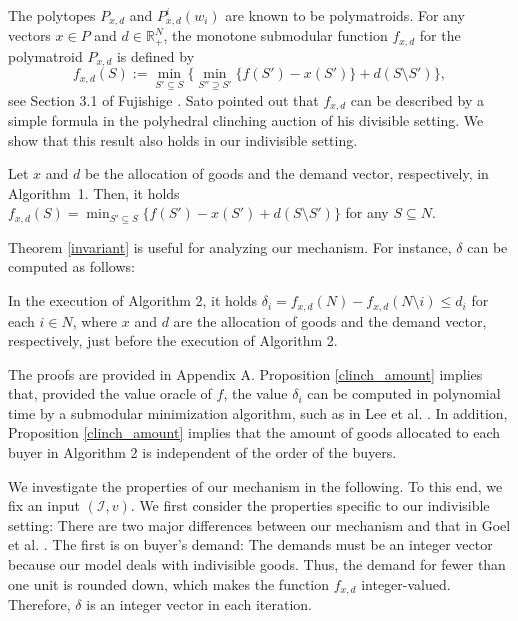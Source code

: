 \documentclass[letterpaper,11pt]{article}
\begin{document}
The polytopes $P_{x,d}$ and $P^{i}_{x,d}(w_i)$ are known to be polymatroids. 
For any vectors $x\in P$ and $d\in \mathbb R^{N}_{+}$, 
the monotone submodular function $f_{x,d}$ for the polymatroid  
$P_{x,d}$ is defined by 
\begin{equation}
\label{naive}
f_{x,d}(S):=\min_{S'\subseteq S}\{\min_{S''\supseteq S'}\{f(S')-x(S')\}+d(S\setminus S')\},
\end{equation} 
see Section 3.1 of Fujishige \cite{F2005}. 
Sato \cite{S2023} pointed out that $f_{x,d}$ can be described by a simple formula 
in the polyhedral clinching auction of his divisible setting.
We show that this result also holds in our indivisible setting. 
\begin{theorem}
\label{invariant}
Let $x$ and $d$ be the allocation of goods and the demand vector, respectively, in Algorithm~1. 
Then, it holds 
$\displaystyle f_{x,d}(S)=\min_{S'\subseteq S}\{f(S')-x(S')+d(S\setminus S')\}$ for any $S\subseteq N$.

\end{theorem}
Theorem \ref{invariant} is useful for analyzing our mechanism. 
For instance, $\delta$ can be computed as follows: 

\begin{proposition}
\label{clinch_amount}
In the execution of Algorithm 2, it holds $\delta_i=f_{x,d}(N)-f_{x,d}(N\setminus i)\leq d_i$ for each $i\in N$,  
where $x$ and $d$ are the allocation of goods and the demand vector, respectively, just before the execution of Algorithm 2.
\end{proposition}

The proofs are provided in Appendix A. 
Proposition \ref{clinch_amount} implies that, provided the value oracle of $f$,
the value $\delta_i$ can be computed in polynomial time 
by a submodular minimization algorithm, such as in Lee et al. \cite{LSW2015}.
In addition, Proposition \ref{clinch_amount} implies that the amount of 
goods allocated to each buyer in Algorithm 2 is independent of the order of the buyers. 


We investigate the properties of our mechanism in the following. 
To this end, we fix an input $(\mathcal I, v)$.
We first consider the properties specific to our indivisible setting: 
There are two major differences between our mechanism and that in Goel et al.  \cite{GMP2015}.
The first is on buyer's demand: 
The demands must be an integer vector because our model deals with indivisible goods.
Thus, the demand for fewer than one unit is rounded down, 
which makes the function $f_{x,d}$ integer-valued.
Therefore, $\delta$ is an integer vector in each iteration.
\end{document}
